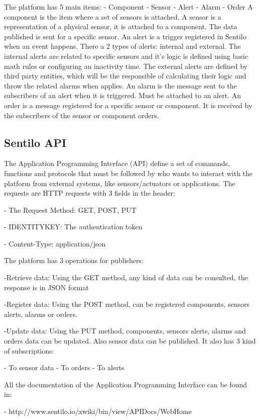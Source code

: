 The platform has 5 main items:
- Component
- Sensor
- Alert
- Alarm
- Order
A component is the item where a set of sensors is attached.
A sensor is a representation of a physical sensor,
	it is attached to a component.
The data published is sent for a specific sensor.
An alert is a trigger registered in Sentilo when an event happens.
There a 2 types of alerts:
	internal and external.
The internal alerts are related to specific sensors and it's logic is defined using basic math rules or configuring an inactivity time.
The external alerts are defined by third party entities,
	which will be the responsible of calculating their logic and throw the related alarms when applies.
An alarm is the message sent to the subscribers of an alert when it is triggered.
Must be attached to an alert.
An order is a message registered for a specific sensor or component.
It is received by the subscribers of the sensor or component orders.

\subsection{Sentilo API}

The Application Programming Interface (API) define a set of commands, functions
and protocols that must be followed by who wants to interact with the platform from
external systems, like sensors/actuators or applications.
The requests are HTTP requests with 3 fields in the header:

- The Request Method: GET, POST, PUT

- IDENTITYKEY: The authentication token

- Content-Type: application/json

The platform has 3 operations for publishers:

-Retrieve data: Using the GET method, any kind of data can be consulted, the
response is in JSON format

-Register data: Using the POST method, can be registered components, sensors
alerts, alarms or orders.

-Update data: Using the PUT method, components, sensors alerts, alarms and
orders data can be updated. Also sensor data can be published.
It also has 3 kind of subscriptions:

- To sensor data
- To orders
- To alerts

All the documentation of the Application Programming Interface can be found in:

- http://www.sentilo.io/xwiki/bin/view/APIDocs/WebHome



